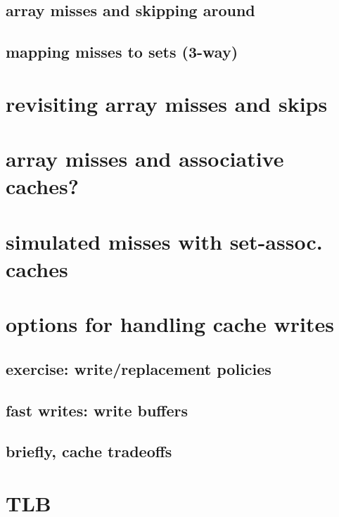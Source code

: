 \subsection{array misses and skipping around}


\subsection{mapping misses to sets (3-way)}


\section{revisiting array misses and skips}

\section{array misses and associative caches?}


\section{simulated misses with set-assoc. caches}


\section{options for handling cache writes}


\subsection{exercise: write/replacement policies}


\subsection{fast writes: write buffers}


\subsection{briefly, cache tradeoffs}


\section{TLB}

